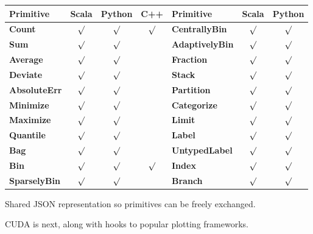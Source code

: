 \documentclass{beamer}
\begin{document}
\begin{frame}{}
\vfill
\begin{minipage}{\linewidth}
\renewcommand{\arraystretch}{1.2}
\begin{tabular}{l c c c | l c c}
Primitive & Scala & Python & C++ & Primitive & Scala & Python \\\hline
{\bf \scriptsize Count}       & $\surd$ & $\surd$ & $\surd$ & {\bf \scriptsize CentrallyBin}    & $\surd$ & $\surd$ \\
{\bf \scriptsize Sum}         & $\surd$ & $\surd$ &      & {\bf \scriptsize AdaptivelyBin}   & $\surd$ & $\surd$ \\
{\bf \scriptsize Average}     & $\surd$ & $\surd$ &      & {\bf \scriptsize Fraction}        & $\surd$ & $\surd$ \\    
{\bf \scriptsize Deviate}     & $\surd$ & $\surd$ &      & {\bf \scriptsize Stack}           & $\surd$ & $\surd$ \\
{\bf \scriptsize AbsoluteErr} & $\surd$ & $\surd$ &      & {\bf \scriptsize Partition}       & $\surd$ & $\surd$ \\
{\bf \scriptsize Minimize}    & $\surd$ & $\surd$ &      & {\bf \scriptsize Categorize}      & $\surd$ & $\surd$ \\
{\bf \scriptsize Maximize}    & $\surd$ & $\surd$ &      & {\bf \scriptsize Limit}           & $\surd$ & $\surd$ \\
{\bf \scriptsize Quantile}    & $\surd$ & $\surd$ &      & {\bf \scriptsize Label}           & $\surd$ & $\surd$ \\
{\bf \scriptsize Bag}         & $\surd$ & $\surd$ &      & {\bf \scriptsize UntypedLabel}    & $\surd$ & $\surd$ \\
{\bf \scriptsize Bin}         & $\surd$ & $\surd$ & $\surd$ & {\bf \scriptsize Index}           & $\surd$ & $\surd$ \\
{\bf \scriptsize SparselyBin} & $\surd$ & $\surd$ &      & {\bf \scriptsize Branch}          & $\surd$ & $\surd$ \\
\end{tabular}
\end{minipage}

\vspace{0.5 cm}
Shared JSON representation so primitives can be freely exchanged.

\vfill
CUDA is next, along with hooks to popular plotting frameworks.
\end{frame}
\end{document}
